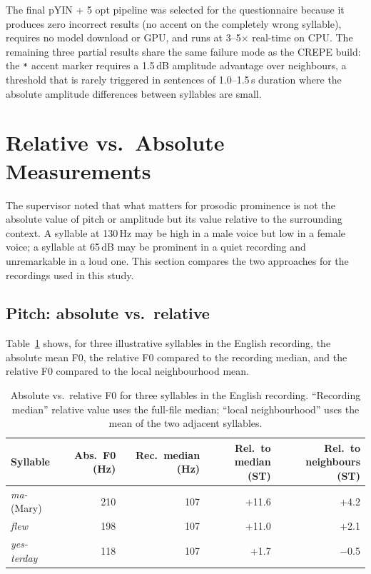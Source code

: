 The final pYIN + 5 opt pipeline was selected for the questionnaire because it
produces zero incorrect results (no accent on the completely wrong syllable),
requires no model download or GPU, and runs at 3--5$\times$ real-time on CPU.
The remaining three partial results share the same failure mode as the CREPE
build: the \texttt{*} accent marker requires a 1.5\,dB amplitude advantage
over neighbours, a threshold that is rarely triggered in sentences of
1.0--1.5\,s duration where the absolute amplitude differences between
syllables are small.

\newpage

\normallinespacing


\section{Relative vs.\ Absolute Measurements}
\label{sec:relative_vs_absolute}

The supervisor noted that what matters for prosodic prominence is not the
absolute value of pitch or amplitude but its value relative to the surrounding
context. A syllable at 130\,Hz may be high in a male voice but low in a female
voice; a syllable at 65\,dB may be prominent in a quiet recording and unremarkable
in a loud one. This section compares the two approaches for the recordings used in
this study.

\subsection{Pitch: absolute vs.\ relative}

Table~\ref{tab:relative_abs} shows, for three illustrative syllables in the
English recording, the absolute mean F0, the relative F0 compared to the
recording median, and the relative F0 compared to the local neighbourhood mean.

\begin{table}[h]
\centering
\caption{Absolute vs.\ relative F0 for three syllables in the English recording.
         ``Recording median'' relative value uses the full-file median;
         ``local neighbourhood'' uses the mean of the two adjacent syllables.}
\label{tab:relative_abs}
\begin{tabular}{lrrrr}
\hline
Syllable & Abs.\ F0 (Hz) & Rec.\ median (Hz) & Rel.\ to median (ST) & Rel.\ to neighbours (ST) \\
\hline
\textit{ma-} (Mary)   & 210 & 107 & +11.6 & +4.2 \\
\textit{flew}         & 198 & 107 & +11.0 & +2.1 \\
\textit{yes-terday}   & 118 & 107 & +1.7  & $-$0.5 \\
\hline
\end{tabular}
\end{table}

